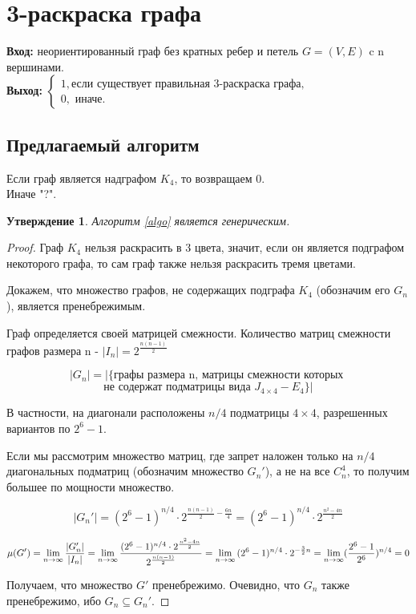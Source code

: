 \documentclass[a4paper, 12pt]{article}
\newtheorem*{theorem}{Утверждение}
\theoremstyle{definition}
\theoremstyle{remark}
\begin{document}
\section*{3-раскраска графа}
\textbf{Вход:} неориентированный граф без кратных ребер и петель $G = (V, E)$ c n вершинами.
\\
\textbf{Выход:} $\begin{cases}
    1,\text{если существует правильная 3-раскраска графа,}\\
    0,\text{ иначе.}
\end{cases}$
\subsection*{Предлагаемый алгоритм} \label{algo}
Если граф является надграфом $K_4$, то возвращаем 0. \\
Иначе "?".
\begin{theorem}
    Алгоритм \ref{algo} является генерическим.
\end{theorem}
\begin{proof}
    Граф $K_4$ нельзя раскрасить в 3 цвета, значит, если он является подграфом некоторого графа, то сам
    граф также нельзя раскрасить тремя цветами.
    
    Докажем, что множество графов, не содержащих подграфа $K_4$ (обозначим его $G_n$), является пренебрежимым.
    
    Граф определяется своей матрицей смежности. Количество матриц смежности графов размера n - $|I_n| = 2^{\frac{n(n-1)}{2}}$
    
    $$|G_n| = |\{\text{графы размера n, матрицы смежности которых }$$
    $$ \text{не содержат подматрицы вида }J_{4\times 4} - E_{4}\}|$$

    В частности, на диагонали расположены $n/4$ подматрицы $4\times 4$, разрешенных вариантов по $2^6 - 1$.

    Если мы рассмотрим множество матриц, где запрет наложен только на $n/4$ диагональных подматриц (обозначим множество $G_n'$), а не на все $C^4_n$, то получим большее по мощности множество.

    $$|G_n'| = (2^6-1)^{n/4} \cdot 2^{\frac{n(n-1)}{2} - \frac{6n}{4}} = (2^6-1)^{n/4} \cdot 2^{\frac{n^2 - 4n}{2}}$$

    $$\mu(G') = \lim_{n\to \infty} \frac{|G_n'|}{|I_n|} = \lim_{n\to \infty} \frac{(2^6-1)^{n/4} \cdot 2^{\frac{n^2 - 4n}{2}}}{2^{n(n-1)\over 2}} = \lim_{n\to\infty} {(2^6-1)^{n/4}}\cdot 2^{-\frac{3}{2}n} = \lim_{n\to \infty} (\frac{2^6 - 1}{2^6})^{n/4} = 0$$

    Получаем, что множество $G'$ пренебрежимо. Очевидно, что $G_n$ также пренебрежимо, ибо $G_n\subseteq G_n'$.

    
\end{proof}
\end{document}
